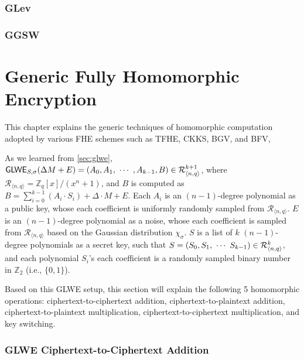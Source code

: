 \documentclass[11pt]{article}
\begin{document}
\clearpage

\section{GLev}
\label{sec:glev}


\clearpage

\section{GGSW}
\label{sec:ggsw}


\clearpage


\part{Generic Fully Homomorphic Encryption}
\label{part:generic-fhe}

\renewcommand{\thesection}{C-\arabic{section}}
\setcounter{section}{0}

This chapter explains the generic techniques of homomorphic computation adopted by various FHE schemes such as TFHE, CKKS, BGV, and BFV,

As we learned from \autoref{sec:glwe}, $\textsf{GLWE}_{S,\sigma}(\Delta M + E) = (A_0, A_1, \text{ } \text{$\cdots$} \text{ } , A_{k-1}, B) \in \mathcal{R}_{\langle n, q \rangle }^{k + 1}$, where $\mathcal{R}_{\langle n,q \rangle} = \mathbb{Z}_q[x] / (x^n + 1)$, and $B$ is computed as $B = \sum\limits_{i=0}^{k-1}{(A_i \cdot S_i)} + \Delta \cdot M + E$. Each $A_i$ is an $(n-1)$-degree polynomial as a public key, whose each coefficient is uniformly randomly sampled from $\mathcal{R}_{\langle n, q \rangle }$. $E$ is an $(n-1)$-degree polynomial as a noise, whose each coefficient is sampled from $\mathcal{R}_{\langle n, q \rangle }$ based on the Gaussian distribution $\chi_\sigma$. $S$ is a list of $k$ $(n-1)$-degree polynomials as a secret key, such that $S = (S_0, S_1, \text{ } \text{$\cdots$} \text{ } S_{k-1} ) \in \mathcal{R}_{\langle n, q \rangle }^k$, and each polynomial $S_i$'s each coefficient is a randomly sampled binary number in $\mathbb{Z}_2$ (i.e., $\{0, 1\}$). 

Based on this GLWE setup, this section will explain the following 5 homomorphic operations: ciphertext-to-ciphertext addition, ciphertext-to-plaintext addition, ciphertext-to-plaintext multiplication, ciphertext-to-ciphertext multiplication, and key switching. 


\clearpage


\section{GLWE Ciphertext-to-Ciphertext Addition}
\label{sec:glwe-add-cipher}

\end{document}
